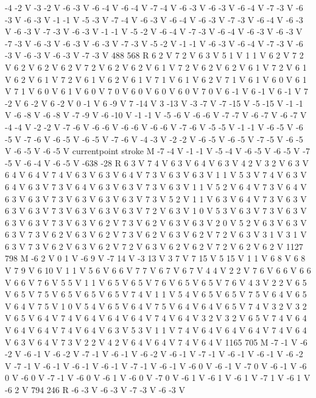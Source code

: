 {{-4 -2 V
-3 -2 V
-6 -3 V
-6 -4 V
-6 -4 V
-7 -4 V
-6 -3 V
-6 -3 V
-6 -4 V
-7 -3 V
-6 -3 V
-6 -3 V
-1 -1 V
-5 -3 V
-7 -4 V
-6 -3 V
-6 -4 V
-6 -3 V
-7 -3 V
-6 -4 V
-6 -3 V
-6 -3 V
-7 -3 V
-6 -3 V
-1 -1 V
-5 -2 V
-6 -4 V
-7 -3 V
-6 -4 V
-6 -3 V
-6 -3 V
-7 -3 V
-6 -3 V
-6 -3 V
-6 -3 V
-7 -3 V
-5 -2 V
-1 -1 V
-6 -3 V
-6 -4 V
-7 -3 V
-6 -3 V
-6 -3 V
-6 -3 V
-7 -3 V
488 568 R
6 2 V
7 2 V
6 3 V
5 1 V
1 1 V
6 2 V
7 2 V
6 2 V
6 2 V
6 2 V
7 2 V
6 2 V
6 2 V
6 1 V
7 2 V
6 2 V
6 2 V
6 1 V
7 2 V
6 1 V
6 2 V
6 1 V
7 2 V
6 1 V
6 2 V
6 1 V
7 1 V
6 1 V
6 2 V
7 1 V
6 1 V
6 0 V
6 1 V
7 1 V
6 0 V
6 1 V
6 0 V
7 0 V
6 0 V
6 0 V
6 0 V
7 0 V
6 -1 V
6 -1 V
6 -1 V
7 -2 V
6 -2 V
6 -2 V
0 -1 V
6 -9 V
7 -14 V
3 -13 V
-3 -7 V
-7 -15 V
-5 -15 V
-1 -1 V
-6 -8 V
-6 -8 V
-7 -9 V
-6 -10 V
-1 -1 V
-5 -6 V
-6 -6 V
-7 -7 V
-6 -7 V
-6 -7 V
-4 -4 V
-2 -2 V
-7 -6 V
-6 -6 V
-6 -6 V
-6 -6 V
-7 -6 V
-5 -5 V
-1 -1 V
-6 -5 V
-6 -5 V
-7 -6 V
-6 -5 V
-6 -5 V
-7 -6 V
-4 -3 V
-2 -2 V
-6 -5 V
-6 -5 V
-7 -5 V
-6 -5 V
-6 -5 V
-6 -5 V
currentpoint stroke M
-7 -4 V
-1 -1 V
-5 -4 V
-6 -5 V
-6 -5 V
-7 -5 V
-6 -4 V
-6 -5 V
-638 -28 R
6 3 V
7 4 V
6 3 V
6 4 V
6 3 V
4 2 V
3 2 V
6 3 V
6 4 V
6 4 V
7 4 V
6 3 V
6 3 V
6 4 V
7 3 V
6 3 V
6 3 V
1 1 V
5 3 V
7 4 V
6 3 V
6 4 V
6 3 V
7 3 V
6 4 V
6 3 V
6 3 V
7 3 V
6 3 V
1 1 V
5 2 V
6 4 V
7 3 V
6 4 V
6 3 V
6 3 V
7 3 V
6 3 V
6 3 V
6 3 V
7 3 V
5 2 V
1 1 V
6 3 V
6 4 V
7 3 V
6 3 V
6 3 V
6 3 V
7 3 V
6 3 V
6 3 V
6 3 V
7 2 V
6 3 V
1 0 V
5 3 V
6 3 V
7 3 V
6 3 V
6 3 V
6 3 V
7 3 V
6 3 V
6 2 V
7 3 V
6 2 V
6 3 V
6 3 V
2 0 V
5 2 V
6 3 V
6 3 V
6 3 V
7 3 V
6 2 V
6 3 V
6 2 V
7 3 V
6 2 V
6 3 V
6 2 V
7 2 V
6 3 V
3 1 V
3 1 V
6 3 V
7 3 V
6 2 V
6 3 V
6 2 V
7 2 V
6 3 V
6 2 V
6 2 V
7 2 V
6 2 V
6 2 V
1127 798 M
-6 2 V
0 1 V
-6 9 V
-7 14 V
-3 13 V
3 7 V
7 15 V
5 15 V
1 1 V
6 8 V
6 8 V
7 9 V
6 10 V
1 1 V
5 6 V
6 6 V
7 7 V
6 7 V
6 7 V
4 4 V
2 2 V
7 6 V
6 6 V
6 6 V
6 6 V
7 6 V
5 5 V
1 1 V
6 5 V
6 5 V
7 6 V
6 5 V
6 5 V
7 6 V
4 3 V
2 2 V
6 5 V
6 5 V
7 5 V
6 5 V
6 5 V
6 5 V
7 4 V
1 1 V
5 4 V
6 5 V
6 5 V
7 5 V
6 4 V
6 5 V
6 4 V
7 5 V
1 0 V
5 4 V
6 5 V
6 4 V
7 5 V
6 4 V
6 4 V
6 5 V
7 4 V
3 2 V
3 2 V
6 5 V
6 4 V
7 4 V
6 4 V
6 4 V
6 4 V
7 4 V
6 4 V
3 2 V
3 2 V
6 5 V
7 4 V
6 4 V
6 4 V
6 4 V
7 4 V
6 4 V
6 3 V
5 3 V
1 1 V
7 4 V
6 4 V
6 4 V
6 4 V
7 4 V
6 4 V
6 3 V
6 4 V
7 3 V
2 2 V
4 2 V
6 4 V
6 4 V
7 4 V
6 4 V
1165 705 M
-7 -1 V
-6 -2 V
-6 -1 V
-6 -2 V
-7 -1 V
-6 -1 V
-6 -2 V
-6 -1 V
-7 -1 V
-6 -1 V
-6 -1 V
-6 -2 V
-7 -1 V
-6 -1 V
-6 -1 V
-6 -1 V
-7 -1 V
-6 -1 V
-6 0 V
-6 -1 V
-7 0 V
-6 -1 V
-6 0 V
-6 0 V
-7 -1 V
-6 0 V
-6 1 V
-6 0 V
-7 0 V
-6 1 V
-6 1 V
-6 1 V
-7 1 V
-6 1 V
-6 2 V
794 246 R
-6 -3 V
-6 -3 V
-7 -3 V
-6 -3 V
}}
